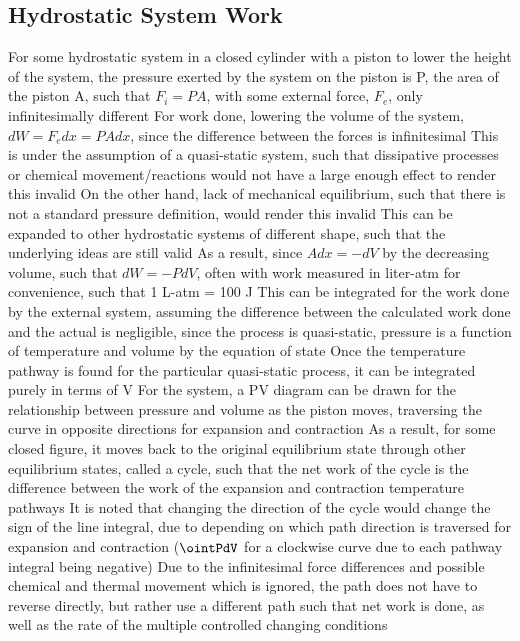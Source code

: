 \subsection{Hydrostatic System Work}
\begin{outline*}
\1 For some hydrostatic system in a closed cylinder with a piston to lower the height of the system, the pressure exerted by the system on the piston is P, the area of the piston A, such that $F_i = PA$, with some external force, $F_e$, only infinitesimally different
\2 For work done, lowering the volume of the system, $dW = F_edx = PAdx$, since the difference between the forces is infinitesimal
\3 This is under the assumption of a quasi-static system, such that dissipative processes or chemical movement/reactions would not have a large enough effect to render this invalid
\3 On the other hand, lack of mechanical equilibrium, such that there is not a standard pressure definition, would render this invalid
\3 This can be expanded to other hydrostatic systems of different shape, such that the underlying ideas are still valid
\2 As a result, since $Adx = -dV$ by the decreasing volume, such that $dW = -PdV$, often with work measured in liter-atm for convenience, such that 1 L-atm = 100 J
\3 This can be integrated for the work done by the external system, assuming the difference between the calculated work done and the actual is negligible, since the process is quasi-static, pressure is a function of temperature and volume by the equation of state
\3 Once the temperature pathway is found for the particular quasi-static process, it can be integrated purely in terms of V
\1 For the system, a PV diagram can be drawn for the relationship between pressure and volume as the piston moves, traversing the curve in opposite directions for expansion and contraction
\2 As a result, for some closed figure, it moves back to the original equilibrium state through other equilibrium states, called a cycle, such that the net work of the cycle is the difference between the work of the expansion and contraction temperature pathways
\2 It is noted that changing the direction of the cycle would change the sign of the line integral, due to depending on which path direction is traversed for expansion and contraction ($\ointPdV$ for a clockwise curve due to each pathway integral being negative)
\2 Due to the infinitesimal force differences and possible chemical and thermal movement which is ignored, the path does not have to reverse directly, but rather use a different path such that net work is done, as well as the rate of the multiple controlled changing conditions

\end{outline*}
